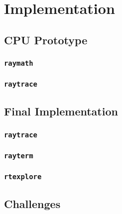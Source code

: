 %
%
%
\chapter{Implementation}\label{ch:implementation}

\section{CPU Prototype}\label{ch:implementation:prototype}

\subsection{\texttt{raymath}}\label{ch:implementation:prototype:raymath}

\subsection{\texttt{raytrace}}\label{ch:implementation:prototype:raytrace}

\section{Final Implementation}\label{ch:implementation:final}

\subsection{\texttt{raytrace}}\label{ch:implementation:final:raytrace}

\subsection{\texttt{rayterm}}\label{ch:implementation:final:rayterm}

\subsection{\texttt{rtexplore}}\label{ch:implementation:final:rtexplore}

\section{Challenges}

